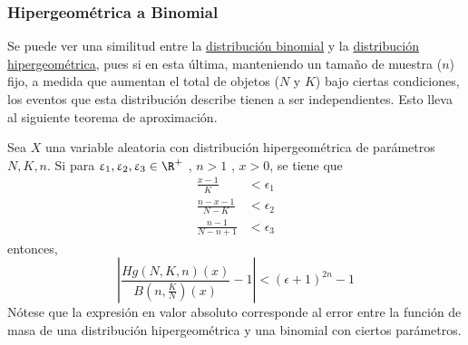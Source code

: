 \subsubsection{Hipergeométrica a Binomial}
Se puede ver una similitud entre la \hyperref[dist:binom]{distribución binomial}
y la \hyperref[dist:hip]{distribución hipergeométrica}, pues si en esta última, manteniendo
un tamaño de muestra ($n$) fijo, a medida que aumentan el total de objetos ($N$ y $K$) bajo
ciertas condiciones, los eventos que esta distribución describe tienen a ser independientes.
Esto lleva al siguiente teorema de aproximación.

\begin{Teo}
  Sea $X$ una variable aleatoria con distribución hipergeométrica de
  parámetros $N,K,n$. Si para $\epsilon_1,\epsilon_2,\epsilon_3\in\R^+$ , $n > 1$ , $x > 0$,
  se tiene que
  \begin{align*}
    \frac{x-1}{K}         &< \epsilon_1\\
    \frac{n-x-1}{N-K}     &< \epsilon_2\\
    \frac{n-1}{N - n + 1} &< \epsilon_3
  \end{align*}
  entonces,
  \[
    \left|\dfrac{Hg(N,K,n)(x)}{B\left(n,\frac{K}{N}\right)(x)} - 1\right| 
    < (\epsilon + 1)^{2n} - 1
  \]
  Nótese que la expresión en valor absoluto corresponde al error entre la
  función de masa de una distribución hipergeométrica y una binomial con ciertos
  parámetros.
\end{Teo}

